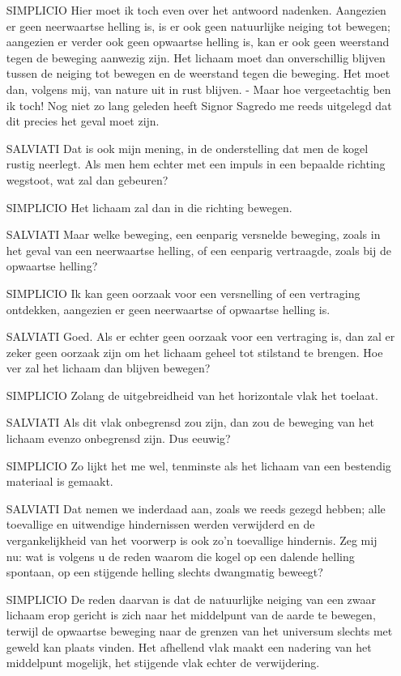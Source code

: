 {\begin{enumerate}
\item[SIMPLICIO]Hier moet ik toch even over het antwoord nadenken. Aangezien er geen neerwaartse helling is, is er ook geen natuurlijke neiging tot bewegen; aangezien er verder ook geen opwaartse helling is, kan er ook geen weerstand tegen de beweging aanwezig zijn. Het lichaam moet dan onverschillig blijven tussen de neiging tot bewegen en de weerstand tegen die beweging. Het moet dan, volgens mij, van nature uit in rust blijven. - Maar hoe vergeetachtig ben ik toch! Nog niet zo lang geleden heeft Signor Sagredo me reeds uitgelegd dat dit precies het geval moet zijn.
\item[SALVIATI]Dat is ook mijn mening, in de onderstelling dat men de kogel rustig neerlegt. Als men hem echter met een impuls in een bepaalde richting wegstoot, wat zal dan gebeuren?
\item[SIMPLICIO]Het lichaam zal dan in die richting bewegen.
\item[SALVIATI]Maar welke beweging, een eenparig versnelde beweging, zoals in het geval van een neerwaartse helling, of een eenparig vertraagde, zoals bij de opwaartse helling?
\item[SIMPLICIO]Ik kan geen oorzaak voor een versnelling of een vertraging ontdekken, aangezien er geen neerwaartse of opwaartse helling is.
\item[SALVIATI]Goed. Als er echter geen oorzaak voor een vertraging is, dan zal er zeker geen oorzaak zijn om het lichaam geheel tot stilstand te brengen. Hoe ver zal het lichaam dan blijven bewegen?
\item[SIMPLICIO]Zolang de uitgebreidheid van het horizontale vlak het toelaat.
\item[SALVIATI]Als dit vlak onbegrensd zou zijn, dan zou de beweging van het lichaam evenzo onbegrensd zijn. Dus eeuwig?
\item[SIMPLICIO]Zo lijkt het me wel, tenminste als het lichaam van een bestendig materiaal is gemaakt.
\item[SALVIATI]Dat nemen we inderdaad aan, zoals we reeds gezegd hebben; alle toevallige en uitwendige hindernissen werden verwijderd en de vergankelijkheid van het voorwerp is ook zo'n toevallige hindernis. Zeg mij nu: wat is volgens u de reden waarom die kogel op een dalende helling spontaan, op een stijgende helling slechts dwangmatig beweegt?
\item[SIMPLICIO]De reden daarvan is dat de natuurlijke neiging van een zwaar lichaam erop gericht is zich naar het middelpunt van de aarde te bewegen, terwijl de opwaartse beweging naar de grenzen van het universum slechts met geweld kan plaats vinden. Het afhellend vlak maakt een nadering van het middelpunt mogelijk, het stijgende vlak echter de verwijdering.

\end{enumerate}}
